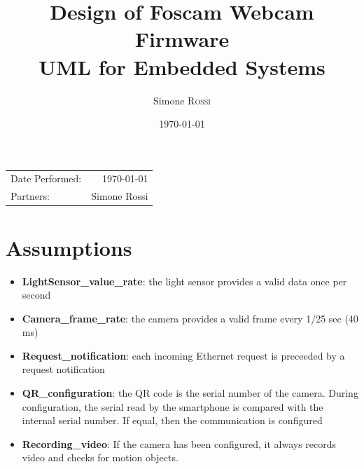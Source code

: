 \documentclass{article}
\title{Design of Foscam Webcam Firmware\\ UML for Embedded Systems} %
\author{Simone \textsc{Rossi}} %
\date{\today} %
\begin{document}
\maketitle %

\begin{center}
\begin{tabular}{l r}
Date Performed: & \today \\ %
Partners: & Simone Rossi \\ %
\end{tabular}
\end{center}



\section{Assumptions}
\begin{itemize}
\item \textbf{LightSensor\_value\_rate}: the light sensor provides a valid data
once per second
\item \textbf{Camera\_frame\_rate}: the camera provides a valid frame every 1/25
sec (40 ms)
\item \textbf{Request\_notification}: each incoming Ethernet request is preceeded
by a request notification
\item \textbf{QR\_configuration}:  the QR code is the serial number of the camera.
During configuration, the serial read by the smartphone is compared with the
internal serial number. If equal, then the communication is configured
\item \textbf{Recording\_video}: If the camera has been configured, it always
records video and checks for motion objects.
\end{itemize}

\newpage
\end{document}
